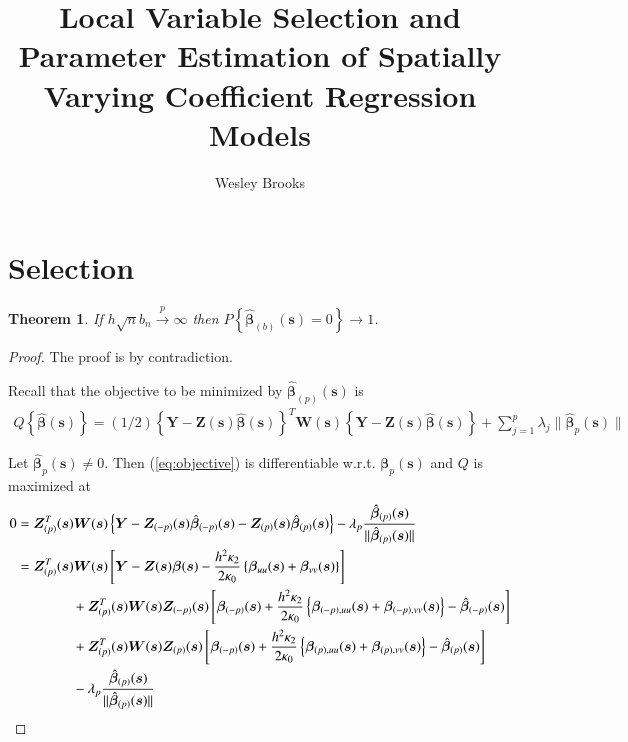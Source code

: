 \documentclass[authoryear, review, 11pt]{elsarticle}
\title{Local Variable Selection and Parameter Estimation of Spatially Varying Coefficient Regression Models}
\author{Wesley Brooks}
\date{}                                           %
\newtheorem{theorem}{Theorem}[section]
\begin{document}
    \section{Selection}
    
    \begin{theorem}\label{theorem:selection}   
        If $h \sqrt{n} b_n \xrightarrow{p} \infty$ then $P \left\{ \hat{\bm{\beta}}_{(b)} (\bm{s}) = 0 \right\} \to 1$.
    \end{theorem}

    \begin{proof}
        The proof is by contradiction.
      
        Recall that the objective to be minimized by $\hat{\bm{\beta}}_{(p)} (\bm{s})$ is
        \begin{align}\label{eq:objective}
            Q \left\{ \hat{\bm{\beta}} (\bm{s}) \right\} = (1/2) \left\{ \bm{Y} - \bm{Z}(\bm{s}) \hat{\bm{\beta}} (\bm{s}) \right\}^T \bm{W}(\bm{s}) \left\{ \bm{Y} - \bm{Z}(\bm{s}) \hat{\bm{\beta}} (\bm{s}) \right\} + \sum_{j=1}^p \lambda_j \| \hat{\bm{\beta}}_p (\bm{s}) \|
        \end{align}

        Let $\hat{\bm{\beta}}_p(\bm{s}) \ne 0$. Then (\ref{eq:objective}) is differentiable w.r.t. $\bm{\beta}_p(\bm{s})$ and $Q$ is maximized at
        \begin{align}\label{eq:selection}
            0 &= \bm{Z}_{(p)}^T(\bm{s}) \bm{W}(\bm{s}) \left\{ \bm{Y} - \bm{Z}_{(-p)}(\bm{s}) \hat{\bm{\beta}}_{(-p)}(\bm{s}) - \bm{Z}_{(p)}(\bm{s}) \hat{\bm{\beta}}_{(p)}(\bm{s}) \right\} - \lambda_p \frac{ \hat{\bm{\beta}}_{(p)}(\bm{s}) }{\| \hat{\bm{\beta}}_{(p)}(\bm{s}) \|} \notag \\
            &= \bm{Z}_{(p)}^T(\bm{s}) \bm{W}(\bm{s}) \left[ \bm{Y} - \bm{Z}(\bm{s}) \bm{\beta}(\bm{s}) - \frac{h^2 \kappa_2}{2 \kappa_0} \left\{ \bm{\beta}_{uu}(\bm{s}) + \bm{\beta}_{vv}(\bm{s}) \right\} \right] \notag \\
            &\mkern+72mu+ \bm{Z}_{(p)}^T(\bm{s}) \bm{W}(\bm{s}) \bm{Z}_{(-p)}(\bm{s}) \left[ \bm{\beta}_{(-p)}(\bm{s}) + \frac{h^2 \kappa_2}{2 \kappa_0} \left\{ \bm{\beta}_{(-p),uu}(\bm{s}) + \bm{\beta}_{(-p),vv}(\bm{s}) \right\} - \hat{\bm{\beta}}_{(-p)}(\bm{s}) \right] \notag \\
            &\mkern+72mu+ \bm{Z}_{(p)}^T(\bm{s}) \bm{W}(\bm{s}) \bm{Z}_{(p)}(\bm{s}) \left[ \bm{\beta}_{(-p)}(\bm{s}) + \frac{h^2 \kappa_2}{2 \kappa_0} \left\{ \bm{\beta}_{(p),uu}(\bm{s}) + \bm{\beta}_{(p),vv}(\bm{s}) \right\} - \hat{\bm{\beta}}_{(p)}(\bm{s}) \right]  \notag \\
            &\mkern+72mu- \lambda_p \frac{ \hat{\bm{\beta}}_{(p)}(\bm{s}) }{\| \hat{\bm{\beta}}_{(p)}(\bm{s}) \|} \notag \\
        \end{align}
        

\end{proof}
\end{document}
